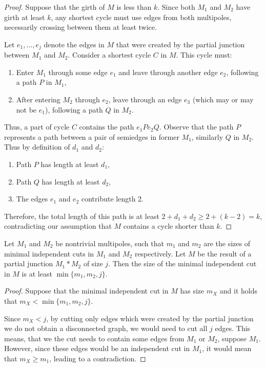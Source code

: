 \documentclass[12pt, twoside]{book}
\begin{document}
\begin{proof}
	Suppose that the girth of $M$ is less than $k$. Since both $M_1$ and $M_2$ have girth at least $k$, any shortest cycle must use edges from both multipoles, necessarily crossing between them at least twice.
	
	Let $e_1,\dots,e_j$ denote the edges in $M$ that were created by the partial junction between $M_1$ and $M_2$. Consider a shortest cycle $C$ in $M$. This cycle must:
	
	\begin{enumerate}
		\item Enter $M_1$ through some edge $e_1$ and leave through another edge $e_2$, following a path $P$ in $M_1$,
		\item After entering $M_2$ through $e_2$, leave through an edge $e_3$ (which may or may not be $e_1$), following a path $Q$ in $M_2$.
	\end{enumerate}

	Thus, a part of cycle $C$ contains the path $e_1Pe_2Q$. Observe that the path $P$ represents a path between a pair of semiedges in former $M_1$, similarly $Q$ in $M_2$. Thus by definition of $d_1$ and $d_2$:
	
	\begin{enumerate}
		\item Path $P$ has length at least $d_1$,
		\item Path $Q$ has length at least $d_2$,
		\item The edges $e_1$ and $e_2$ contribute length 2.
	\end{enumerate}

	Therefore, the total length of this path is at least $2+d_1+d_2 \geq 2+(k-2) = k$, contradicting our assumption that $M$ contains a cycle shorter than $k$.
\end{proof}

\begin{lemma}\label{lem:size-of-minimal-potentially-cycle-separating-after-junction}
	Let $M_1$ and $M_2$ be nontrivial multipoles, such that $m_1$ and $m_2$ are the sizes of minimal independent cuts in $M_1$ and $M_2$ respectively. Let $M$ be the result of a partial junction $M_1*M_2$ of size $j$. Then the size of the minimal independent cut in $M$ is at least $\min\{m_1,m_2,j\}$.
\end{lemma}

\begin{proof}
	Suppose that the minimal independent cut in $M$ has size $m_X$ and it holds that $m_X<\min\{m_1,m_2,j\}$.
	
	Since $m_X<j$, by cutting only edges which were created by the partial junction we do not obtain a disconnected graph, we would need to cut all $j$ edges.  This means, that we the cut needs to contain some edges from $M_1$ or $M_2$, suppose $M_1$. However, since these edges would be an independent cut in $M_1$, it would mean that $m_X\geq m_1$, leading to a contradiction.
\end{proof}
\end{document}
